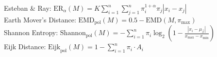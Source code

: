 \documentclass[preview]{standalone}
\begin{document}
Esteban \& Ray: $\text{ER}_{\alpha}(M)=K \sum _{i=1}^n \sum _{j=1}^n \pi _{i}^{1+\alpha}\pi _{j} |x_i-x_j|$\\Earth Mover's Distance: $\mathrm{EMD}_\text{pol}(M)=0.5-\mathrm{EMD}(M,\pi_{\max})$\\Shannon Entropy: $\mathrm{Shannon}_{\text{pol}}(M) = -\sum_{i=1}^{n} \pi_i \log_2 \left( 1 - \frac{|x_i - \mu_\vec{x}|}{x_{\max} - x_{\min}} \right)$\\Eijk Distance: $\mathrm{Eijk}_{\text{pol}}(M) = 1- \sum_{i=1}^n \pi_i \cdot A_i$\\
\end{document}
